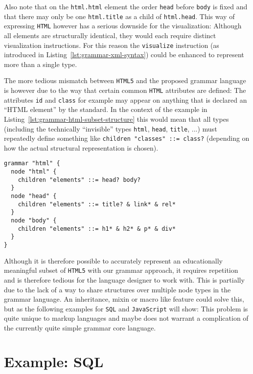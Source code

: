 \documentclass[sigconf,natbib=false]{acmart}
\newcommand{\enquote}[1]{``#1''}
\begin{document}
Also note that on the \texttt{html.html} element the order \texttt{head} before \texttt{body} is fixed and that there may only be one \texttt{html.title} as a child of \texttt{html.head}. This way of expressing \texttt{HTML} however has a serious downside for the visualization: Although all elements are structurally identical, they would each require distinct visualization instructions. For this reason the \texttt{visualize} instruction (as introduced in Listing~\ref{lst:grammar-xml-syntax}) could be enhanced to represent more than a single type.

The more tedious mismatch between \texttt{HTML5} and the proposed grammar language is however due to the way that certain common \texttt{HTML} attributes are defined: The attributes \texttt{id} and \texttt{class} for example may appear on anything that is declared an \enquote{HTML element} by the standard. In the context of the example in Listing~\ref{lst:grammar-html-subset-structure} this would mean that all types (including the technically \enquote{invisible} types \texttt{html}, \texttt{head}, \texttt{title}, ...) must repeatedly define something like \texttt{children "classes" ::= class?} (depending on how the actual structural representation is chosen).

\begin{lstlisting}[float,caption={Semantic structure for \texttt{HTML} subset}, label=lst:grammar-html-subset-structure]
grammar "html" {
  node "html" {
    children "elements" ::= head? body?
  }
  node "head" {
    children "elements" ::= title? & link* & rel*
  }
  node "body" {
    children "elements" ::= h1* & h2* & p* & div*
  }
}
\end{lstlisting}

Although it is therefore possible to accurately represent an educationally meaningful subset of \texttt{HTML5} with our grammar approach, it requires repetition and is therefore tedious for the language designer to work with. This is partially due to the lack of a way to share structures over multiple node types in the grammar language. An inheritance, mixin or macro like feature could solve this, but as the following examples for \texttt{SQL} and \texttt{JavaScript} will show: This problem is quite unique to markup languages and maybe does not warrant a complication of the currently quite simple grammar core language.

\section{Example: SQL}
\end{document}
